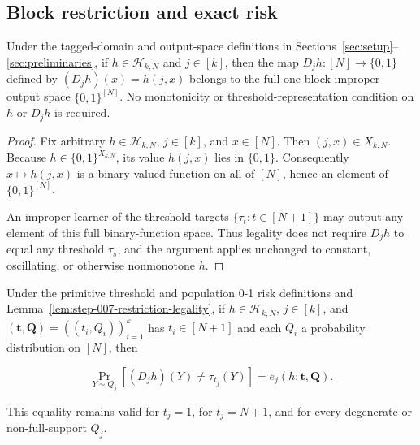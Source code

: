 \subsection{Block restriction and exact risk}\label{app:step-007}
\begin{lemma}\label{lem:step-007-restriction-legality}
Under the tagged-domain and output-space definitions in
Sections~\ref{sec:setup}--\ref{sec:preliminaries}, if
\(h\in\mathcal H_{k,N}\) and \(j\in[k]\), then the map
\(D_jh:[N]\to\{0,1\}\) defined by \((D_jh)(x)=h(j,x)\) belongs to the full
one-block improper output space \(\{0,1\}^{[N]}\). No monotonicity or
threshold-representation condition on \(h\) or \(D_jh\) is required.
\end{lemma}

\begin{proof}
Fix arbitrary \(h\in\mathcal H_{k,N}\), \(j\in[k]\), and \(x\in[N]\).
Then \((j,x)\in X_{k,N}\). Because
\(h\in\{0,1\}^{X_{k,N}}\), its value \(h(j,x)\) lies in \(\{0,1\}\).
Consequently \(x\mapsto h(j,x)\) is a binary-valued function on all of
\([N]\), hence an element of \(\{0,1\}^{[N]}\).

An improper learner of the threshold targets \(\{\tau_t:t\in[N+1]\}\)
may output any element of this full binary-function space. Thus legality
does not require \(D_jh\) to equal any threshold \(\tau_s\), and the argument
applies unchanged to constant, oscillating, or otherwise nonmonotone \(h\).
\end{proof}

\begin{proposition}\label{prop:step-007-risk-identity}
Under the primitive threshold and population 0-1 risk definitions and
Lemma~\ref{lem:step-007-restriction-legality}, if
\(h\in\mathcal H_{k,N}\), \(j\in[k]\), and
\((\boldsymbol t,\boldsymbol Q)=((t_i,Q_i))_{i=1}^k\) has
\(t_i\in[N+1]\) and each \(Q_i\) a probability distribution on \([N]\),
then

\[
  \Pr_{Y\sim Q_j}\!\left[(D_jh)(Y)\ne\tau_{t_j}(Y)\right]
  =e_j(h;\boldsymbol t,\boldsymbol Q).
\]

This equality remains valid for \(t_j=1\), for \(t_j=N+1\), and for every
degenerate or non-full-support \(Q_j\).
\end{proposition}

